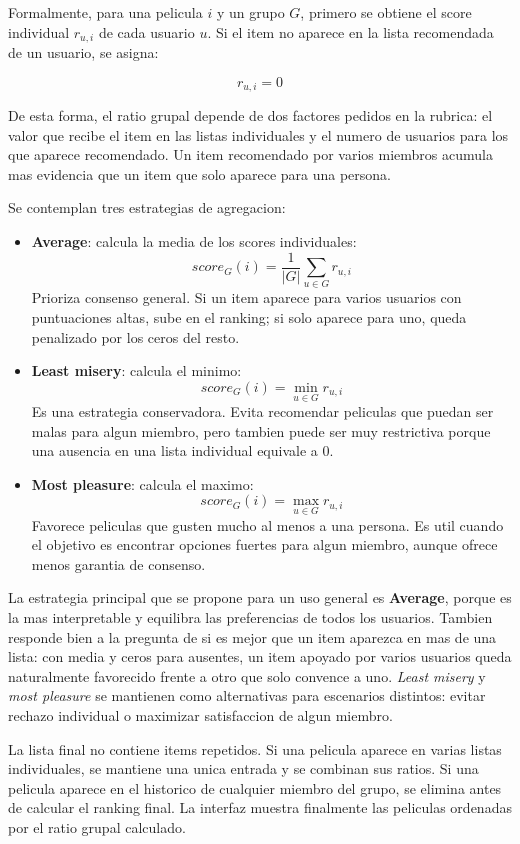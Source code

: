 \documentclass[12pt,a4paper]{article}
\begin{document}
Formalmente, para una pelicula $i$ y un grupo $G$, primero se obtiene el score individual $r_{u,i}$ de cada usuario $u$. Si el item no aparece en la lista recomendada de un usuario, se asigna:

\[
r_{u,i}=0
\]

De esta forma, el ratio grupal depende de dos factores pedidos en la rubrica: el valor que recibe el item en las listas individuales y el numero de usuarios para los que aparece recomendado. Un item recomendado por varios miembros acumula mas evidencia que un item que solo aparece para una persona.

Se contemplan tres estrategias de agregacion:

\begin{itemize}[leftmargin=*]
\item \textbf{Average}: calcula la media de los scores individuales:
\[
score_G(i)=\frac{1}{|G|}\sum_{u \in G} r_{u,i}
\]
Prioriza consenso general. Si un item aparece para varios usuarios con puntuaciones altas, sube en el ranking; si solo aparece para uno, queda penalizado por los ceros del resto.
\item \textbf{Least misery}: calcula el minimo:
\[
score_G(i)=\min_{u \in G} r_{u,i}
\]
Es una estrategia conservadora. Evita recomendar peliculas que puedan ser malas para algun miembro, pero tambien puede ser muy restrictiva porque una ausencia en una lista individual equivale a 0.
\item \textbf{Most pleasure}: calcula el maximo:
\[
score_G(i)=\max_{u \in G} r_{u,i}
\]
Favorece peliculas que gusten mucho al menos a una persona. Es util cuando el objetivo es encontrar opciones fuertes para algun miembro, aunque ofrece menos garantia de consenso.
\end{itemize}

La estrategia principal que se propone para un uso general es \textbf{Average}, porque es la mas interpretable y equilibra las preferencias de todos los usuarios. Tambien responde bien a la pregunta de si es mejor que un item aparezca en mas de una lista: con media y ceros para ausentes, un item apoyado por varios usuarios queda naturalmente favorecido frente a otro que solo convence a uno. \emph{Least misery} y \emph{most pleasure} se mantienen como alternativas para escenarios distintos: evitar rechazo individual o maximizar satisfaccion de algun miembro.

La lista final no contiene items repetidos. Si una pelicula aparece en varias listas individuales, se mantiene una unica entrada y se combinan sus ratios. Si una pelicula aparece en el historico de cualquier miembro del grupo, se elimina antes de calcular el ranking final. La interfaz muestra finalmente las peliculas ordenadas por el ratio grupal calculado.
\end{document}
